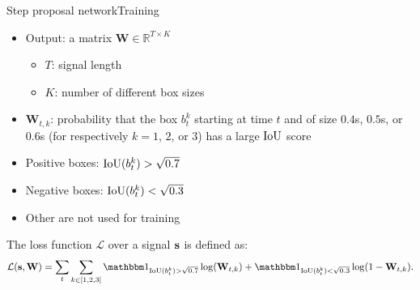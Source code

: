 \begin{frame}{Step proposal network}{Training}
\begin{itemize}
    \item Output: a matrix $\mathbf{W} \in \mathbb{R}^{T \times K}$
    \begin{itemize}
        \item $T$: signal length
        \item $K$: number of different box sizes
    \end{itemize}

    \item $\mathbf{W}_{t,k}$: probability that the box $b_t^k$ starting at time $t$ and of size $0.4$s, $0.5$s, or $0.6$s (for respectively $k=1$, $2$, or $3$) has a large $\mathrm{IoU}$ score
    \item Positive boxes: $\mathrm{IoU}(b_t^{k}) > \sqrt{0.7}$
    \item Negative boxes: $\mathrm{IoU}(b_t^{k}) < \sqrt{0.3}$
    \item Other are not used for training
\end{itemize}

\vspace{0.8cm}

The loss function $\mathcal{L}$ over a signal $\mathbf{s}$ is defined as:
\begin{equation*}\label{eq: loss training CNN}
\mathcal{L}(\bfs, \mathbf{W}) = \sum_{t} \sum_{k \in \left[1, 2, 3 \right]} \bbmind_{ \iou(b_t^{k})> \sqrt{0.7} } \log(\mathbf{W}_{t,k}) + \bbmind_{ \iou(b_t^{k})< \sqrt{0.3} } \log(1-\mathbf{W}_{t,k}). 
\end{equation*}
\end{frame}




